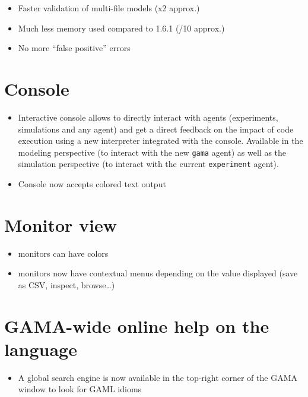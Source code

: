 \documentclass[]{book}
\providecommand{\tightlist}{%
  \setlength{\itemsep}{0pt}\setlength{\parskip}{0pt}}
\theoremstyle{definition}
\theoremstyle{definition}
\theoremstyle{definition}
\theoremstyle{remark}
\begin{document}
\begin{itemize}
\tightlist
\item
  Faster validation of multi-file models (x2 approx.)
\item
  Much less memory used compared to 1.6.1 (/10 approx.)
\item
  No more ``false positive'' errors
\end{itemize}

\section{Console}\label{console}

\begin{itemize}
\tightlist
\item
  Interactive console allows to directly interact with agents
  (experiments, simulations and any agent) and get a direct feedback on
  the impact of code execution using a new interpreter integrated with
  the console. Available in the modeling perspective (to interact with
  the new \texttt{gama} agent) as well as the simulation perspective (to
  interact with the current \texttt{experiment} agent).
\item
  Console now accepts colored text output
\end{itemize}

\section{Monitor view}\label{monitor-view}

\begin{itemize}
\tightlist
\item
  monitors can have colors
\item
  monitors now have contextual menus depending on the value displayed
  (save as CSV, inspect, browse\ldots{})
\end{itemize}

\section{GAMA-wide online help on the
language}\label{gama-wide-online-help-on-the-language}

\begin{itemize}
\tightlist
\item
  A global search engine is now available in the top-right corner of the
  GAMA window to look for GAML idioms
\end{itemize}
\end{document}
